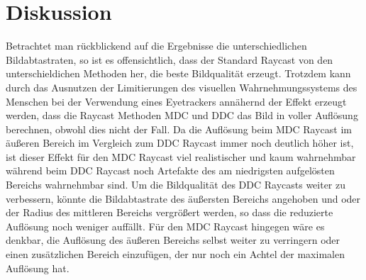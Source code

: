 \section{Diskussion}\label{sec::disc}
Betrachtet man rückblickend auf die Ergebnisse die unterschiedlichen Bildabtastraten, so ist es offensichtlich, dass der Standard Raycast von den unterschieldichen Methoden her, die beste Bildqualität erzeugt.
Trotzdem kann durch das Ausnutzen der Limitierungen des visuellen Wahrnehmungssystems des Menschen bei der Verwendung eines Eyetrackers annähernd der Effekt erzeugt werden, dass die Raycast Methoden MDC und DDC das Bild in voller Auflösung berechnen, obwohl dies nicht der Fall.
Da die Auflösung beim MDC Raycast im äußeren Bereich im Vergleich zum DDC Raycast immer noch deutlich höher ist, ist dieser Effekt für den MDC Raycast viel realistischer und kaum wahrnehmbar während beim DDC Raycast noch Artefakte des am niedrigsten aufgelösten Bereichs wahrnehmbar sind.
Um die Bildqualität des DDC Raycasts weiter zu verbessern, könnte die Bildabtastrate des äußersten Bereichs angehoben und oder der Radius des mittleren Bereichs vergrößert werden, so dass die reduzierte Auflösung noch weniger auffällt.
Für den MDC Raycast hingegen wäre es denkbar, die Auflösung des äußeren Bereichs selbst weiter zu verringern oder einen zusätzlichen Bereich einzufügen, der nur noch ein Achtel der maximalen Auflösung hat.

